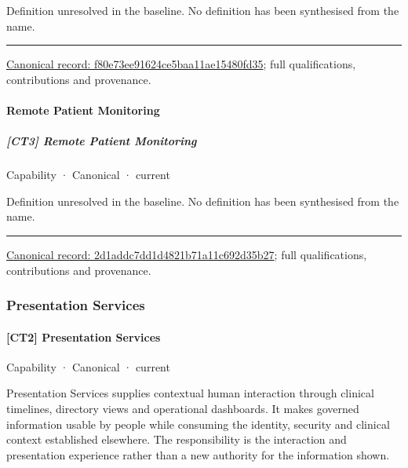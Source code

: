 Definition unresolved in the baseline. No definition has been synthesised from the name.



\medskip\hrule\medskip

{\footnotesize \href{../../../../continuum/strategy/capability/f80e73ee91624ce5baa11ae15480fd35.md}{Canonical record: f80e73ee91624ce5baa11ae15480fd35}; full qualifications, contributions and provenance.}\par
\paragraph{Remote Patient Monitoring}

\subparagraph{[CT3] Remote Patient Monitoring}

\label{element:2d1addc7dd1d4821b71a11c692d35b27}
{\small Capability · Canonical · current}\par

Definition unresolved in the baseline. No definition has been synthesised from the name.



\medskip\hrule\medskip

{\footnotesize \href{../../../../continuum/strategy/capability/2d1addc7dd1d4821b71a11c692d35b27.md}{Canonical record: 2d1addc7dd1d4821b71a11c692d35b27}; full qualifications, contributions and provenance.}\par
\subsubsection{Presentation Services}

\paragraph{[CT2] Presentation Services}

\label{element:e9b6ba1917ba44cca7466444d0836c98}
{\small Capability · Canonical · current}\par

Presentation Services supplies contextual human interaction through clinical timelines, directory views and operational dashboards. It makes governed information usable by people while consuming the identity, security and clinical context established elsewhere. The responsibility is the interaction and presentation experience rather than a new authority for the information shown.



